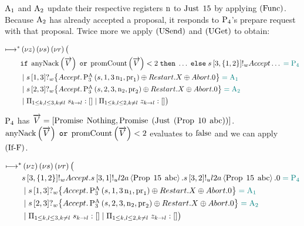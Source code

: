 $\operatorname{A_{1}}$ and $\operatorname{A_{2}}$ update their respective registers $\operatorname{n}$ to $\operatorname{Just}\; 15$ by applying $\left(\operatorname{Func}\right)$.
Because $\operatorname{A_{2}}$ has already accepted a proposal, it responds to $\operatorname{P_{4}}$'s prepare request with that proposal.
Twice more we apply $\left(\operatorname{USend}\right)$ and $\left(\operatorname{UGet}\right)$ to obtain:

\begin{align*}
\longmapsto^*& \left(\nu z\right)\left(\nu s\right)\left(\nu r\right) \big (\\
&
    \mathtt{if}\; \operatorname{anyNack}\left(\overrightarrow{V}\right) \; \mathtt{or} \; \operatorname{promCount}\left(\overrightarrow{V}\right) < 2
    \;\mathtt{then}\; \ldots
    \;\mathtt{else}\;
        s\left[3, \left\{1,2\right\}\right]!_w \mathnormal{Accept}
        \ldots
    \;\textcolor{teal}{= \operatorname{P_{4}}}\\
&\; | \;
    s\left[1, 3\right]?_w \big\{
        \mathnormal{Accept} . \textstyle\operatorname{P^{A}_{3}}\left(s, 1, 3 \operatorname{n}_1, \operatorname{pr}_1\right)
        \oplus \mathnormal{Restart}. X
        \oplus \mathnormal{Abort} . 0
    \big\}
    \;\textcolor{teal}{= \operatorname{A_{1}}}\\
&\; | \;
    s\left[2, 3\right]?_w \big\{
        \mathnormal{Accept} . \textstyle\operatorname{P^{A}_{3}}\left(s, 2, 3, \operatorname{n}_2, \operatorname{pr}_2\right)
        \oplus \mathnormal{Restart}. X
        \oplus \mathnormal{Abort} . 0
    \big\}
    \;\textcolor{teal}{= \operatorname{A_{2}}}\\
&\; | \; \Pi_{1 \le k,l \le 3, k \neq l}\; s_{k\to l}:[]
\; | \; \Pi_{1 \le k,l \le 2, k \neq l}\; z_{k\to l}:[]
\big )
\end{align*}

$\operatorname{P_{4}}$ has $\overrightarrow{V} = \left[\operatorname{Promise}\; \operatorname{Nothing}, \operatorname{Promise}\; \left(\operatorname{Just}\; \left(\operatorname{Prop}\; 10\; \operatorname{abc}\right)\right)\right]$.
$\operatorname{anyNack}\left(\overrightarrow{V}\right) \; \mathtt{or} \; \operatorname{promCount}\left(\overrightarrow{V}\right) < 2$ evaluates to $\operatorname{false}$ and we can apply $\left(\operatorname{If-F}\right)$.

\begin{align*}
\longmapsto^*& \left(\nu z\right)\left(\nu s\right)\left(\nu r\right) \big (\\
&
    s\left[3, \left\{1,2\right\}\right]!_w \mathnormal{Accept}.
    s\left[3, 1\right]!_u l2a \left\langle \operatorname{Prop}\; 15\; \operatorname{abc} \right\rangle.
    s\left[3, 2\right]!_u l2a \left\langle \operatorname{Prop}\; 15\; \operatorname{abc} \right\rangle.
    0
    \;\textcolor{teal}{= \operatorname{P_{4}}}\\
&\; | \;
    s\left[1, 3\right]?_w \big\{
        \mathnormal{Accept} . \textstyle\operatorname{P^{A}_{3}}\left(s, 1, 3 \operatorname{n}_1, \operatorname{pr}_1\right)
        \oplus \mathnormal{Restart}. X
        \oplus \mathnormal{Abort} . 0
    \big\}
    \;\textcolor{teal}{= \operatorname{A_{1}}}\\
&\; | \;
    s\left[2, 3\right]?_w \big\{
        \mathnormal{Accept} . \textstyle\operatorname{P^{A}_{3}}\left(s, 2, 3, \operatorname{n}_2, \operatorname{pr}_2\right)
        \oplus \mathnormal{Restart}. X
        \oplus \mathnormal{Abort} . 0
    \big\}
    \;\textcolor{teal}{= \operatorname{A_{2}}}\\
&\; | \; \Pi_{1 \le k,l \le 3, k \neq l}\; s_{k\to l}:[]
\; | \; \Pi_{1 \le k,l \le 2, k \neq l}\; z_{k\to l}:[]
\big )
\end{align*}

